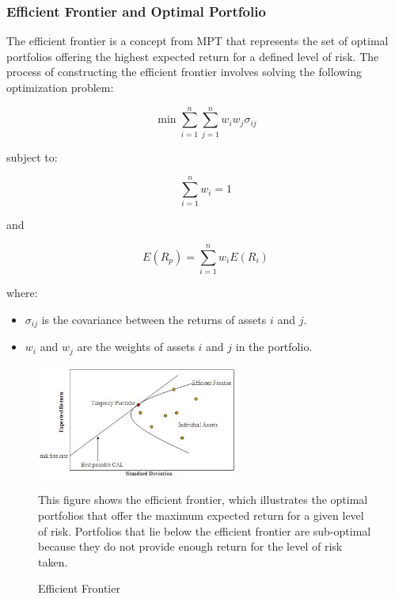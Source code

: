 \subsubsection{Efficient Frontier and Optimal Portfolio}
The efficient frontier is a concept from MPT that represents the set of optimal portfolios offering the highest expected return for a defined level of risk. The process of constructing the efficient frontier involves solving the following optimization problem:

\begin{equation}
\min \sum_{i=1}^n \sum_{j=1}^n w_i w_j \sigma_{ij}
\end{equation}

subject to:

\begin{equation}
\sum_{i=1}^n w_i = 1
\end{equation}

and

\begin{equation}
E(R_p) = \sum_{i=1}^n w_iE(R_i)
\end{equation}

where:
\begin{itemize}
    \item $\sigma_{ij}$ is the covariance between the returns of assets $i$ and $j$.
    \item $w_i$ and $w_j$ are the weights of assets $i$ and $j$ in the portfolio.
\end{itemize}

\begin{figure}[h!]
    \centering
    \includegraphics[width=0.6\textwidth]{../Figures/efficient_frontier.png}
    \caption{Efficient Frontier}
    \label{fig:efficient_frontier}
    \subcaption This figure shows the efficient frontier, which illustrates the optimal portfolios that offer the maximum expected return for a given level of risk. Portfolios that lie below the efficient frontier are sub-optimal because they do not provide enough return for the level of risk taken.
\end{figure}






